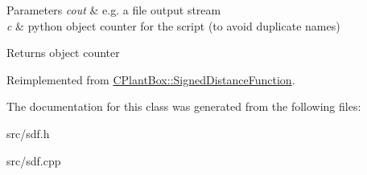 \begin{DoxyParams}{Parameters}
{\em cout} & e.\+g. a file output stream \\
\hline
{\em c} & python object counter for the script (to avoid duplicate names) \\
\hline
\end{DoxyParams}
\begin{DoxyReturn}{Returns}
object counter 
\end{DoxyReturn}


Reimplemented from \hyperlink{classCPlantBox_1_1SignedDistanceFunction_a0098fb469c9be5557d5593cec9e76d2a}{C\+Plant\+Box\+::\+Signed\+Distance\+Function}.



The documentation for this class was generated from the following files\+:\begin{DoxyCompactItemize}
\item 
src/sdf.\+h\item 
src/sdf.\+cpp\end{DoxyCompactItemize}

